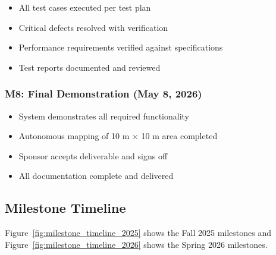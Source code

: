 \begin{itemize}
    \item All test cases executed per test plan
    \item Critical defects resolved with verification
    \item Performance requirements verified against specifications
    \item Test reports documented and reviewed
\end{itemize}

\subsubsection{M8: Final Demonstration (May 8, 2026)}

\begin{itemize}
    \item System demonstrates all required functionality
    \item Autonomous mapping of 10 m × 10 m area completed
    \item Sponsor accepts deliverable and signs off
    \item All documentation complete and delivered
\end{itemize}

\subsection{Milestone Timeline}

Figure~\ref{fig:milestone_timeline_2025} shows the Fall 2025 milestones and Figure~\ref{fig:milestone_timeline_2026} shows the Spring 2026 milestones.

